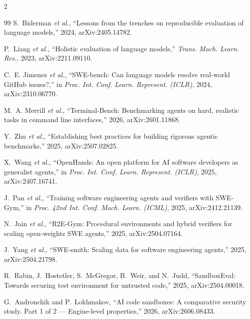 \documentclass[10pt,a4paper]{article}
\begin{document}
\begin{multicols}{2}
\begin{thebibliography}{99}
S.~Biderman \emph{et al.}, ``Lessons from the trenches on reproducible
evaluation of language models,'' 2024, arXiv:2405.14782.

P.~Liang \emph{et al.}, ``Holistic evaluation of language models,''
\emph{Trans. Mach. Learn. Res.}, 2023, arXiv:2211.09110.

C.~E. Jimenez \emph{et al.}, ``SWE-bench: Can language models resolve
real-world GitHub issues?,'' in \emph{Proc. Int. Conf. Learn. Represent.
(ICLR)}, 2024, arXiv:2310.06770.

M.~A. Merrill \emph{et al.}, ``Terminal-Bench: Benchmarking agents on
hard, realistic tasks in command line interfaces,'' 2026,
arXiv:2601.11868.

Y.~Zhu \emph{et al.}, ``Establishing best practices for building rigorous
agentic benchmarks,'' 2025, arXiv:2507.02825.

X.~Wang \emph{et al.}, ``OpenHands: An open platform for AI software
developers as generalist agents,'' in \emph{Proc. Int. Conf. Learn.
Represent. (ICLR)}, 2025, arXiv:2407.16741.

J.~Pan \emph{et al.}, ``Training software engineering agents and verifiers
with SWE-Gym,'' in \emph{Proc. 42nd Int. Conf. Mach. Learn. (ICML)}, 2025,
arXiv:2412.21139.

N.~Jain \emph{et al.}, ``R2E-Gym: Procedural environments and hybrid
verifiers for scaling open-weights SWE agents,'' 2025, arXiv:2504.07164.

J.~Yang \emph{et al.}, ``SWE-smith: Scaling data for software engineering
agents,'' 2025, arXiv:2504.21798.

R.~Rabin, J.~Hostetler, S.~McGregor, B.~Weir, and N.~Judd,
``SandboxEval: Towards securing test environment for untrusted code,''
2025, arXiv:2504.00018.

G.~Andronchik and P.~Lokhmakov, ``AI code sandboxes: A comparative
security study. Part 1 of 2 --- Engine-level properties,'' 2026,
arXiv:2606.08433.

\end{thebibliography}
\end{multicols}
\endgroup
\end{document}
